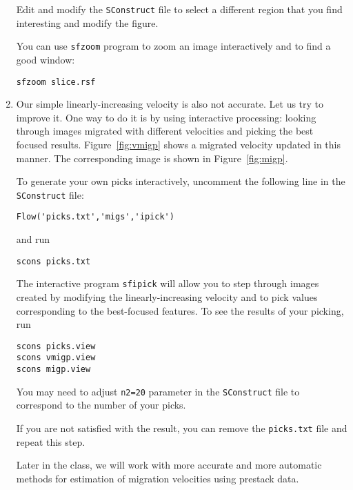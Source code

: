 \begin{enumerate}

Edit and modify the \texttt{SConstruct} file to select a different region that you find interesting and modify the figure.

You can use \texttt{sfzoom} program to zoom an image interactively and to find a good window:
\begin{verbatim}
sfzoom slice.rsf
\end{verbatim}

\item Our simple linearly-increasing velocity is also not accurate. Let us try to improve it. One way to do it is by using interactive processing: looking through images migrated with different velocities and picking the best focused results. Figure~\ref{fig:vmigp} shows a migrated velocity updated in this manner. The corresponding image is shown in Figure~\ref{fig:migp}.

To generate your own picks interactively, uncomment the following line in the \texttt{SConstruct} file:
\begin{verbatim}
Flow('picks.txt','migs','ipick')
\end{verbatim}
and run
\begin{verbatim}
scons picks.txt
\end{verbatim}
The interactive program \texttt{sfipick} will allow you to step
through images created by modifying the linearly-increasing velocity
and to pick values corresponding to the best-focused features. To see
the results of your picking, run
\begin{verbatim}
scons picks.view
scons vmigp.view
scons migp.view
\end{verbatim}
You may need to adjust \texttt{n2=20} parameter in
the \texttt{SConstruct} file to correspond to the number of your
picks.

If you are not satisfied with the result, you can remove the \texttt{picks.txt} file and repeat this step.


Later in the class, we will work with more accurate and more automatic
methods for estimation of migration velocities using prestack data.

\end{enumerate}

\lstset{language=python,numbers=left,numberstyle=\tiny,showstringspaces=false}


